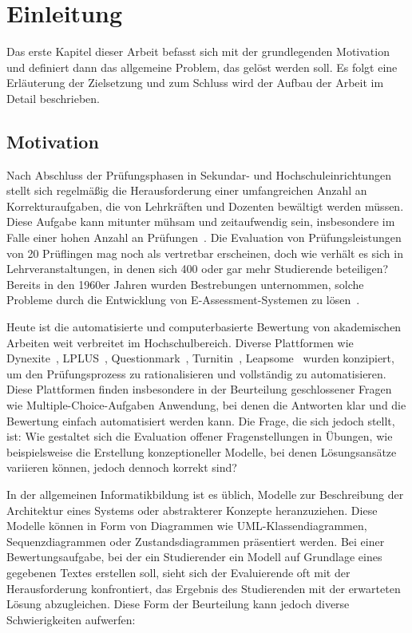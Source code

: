 \chapter{Einleitung}

Das erste Kapitel dieser Arbeit befasst sich mit der grundlegenden Motivation und definiert dann das allgemeine Problem, das gelöst werden soll. Es folgt eine Erläuterung der Zielsetzung und zum Schluss wird der Aufbau der Arbeit im Detail beschrieben.

\section{Motivation}

Nach Abschluss der Prüfungsphasen in Sekundar- und Hochschuleinrichtungen stellt sich regelmäßig die Herausforderung
einer umfangreichen Anzahl an Korrekturaufgaben, die von Lehrkräften und Dozenten bewältigt werden müssen. Diese Aufgabe
kann mitunter mühsam und zeitaufwendig sein, insbesondere im Falle einer hohen Anzahl an Prüfungen~\cite{aufwendig}.
Die Evaluation von Prüfungsleistungen von 20 Prüflingen mag noch als vertretbar erscheinen, doch wie verhält es sich in
Lehrveranstaltungen, in denen sich 400 oder gar mehr Studierende beteiligen? Bereits in den 1960er Jahren wurden
Bestrebungen unternommen, solche Probleme durch die Entwicklung von \gls{E-Assessment-Systemen} zu lösen~\cite{Hollingsworth}.

Heute ist die automatisierte und computerbasierte Bewertung von akademischen Arbeiten weit verbreitet im
Hochschulbereich. Diverse Plattformen wie Dynexite~\cite{Dynexite}, LPLUS~\cite{LPLUS}, Questionmark~\cite{Questionmark},
Turnitin~\cite{Turnitin}, Leapsome~\cite{leapsome} wurden konzipiert, um den Prüfungsprozess zu rationalisieren und vollständig zu automatisieren.
Diese Plattformen finden insbesondere in der Beurteilung geschlossener Fragen wie Multiple-Choice-Aufgaben Anwendung,
bei denen die Antworten klar und die Bewertung einfach automatisiert werden kann. Die Frage, die sich jedoch stellt,
ist: Wie gestaltet sich die Evaluation offener Fragenstellungen in Übungen, wie beispielsweise die Erstellung
konzeptioneller Modelle, bei denen Lösungsansätze variieren können, jedoch dennoch korrekt sind?

In der allgemeinen Informatikbildung ist es üblich, Modelle zur Beschreibung der Architektur eines Systems oder
abstrakterer Konzepte heranzuziehen. Diese Modelle können in Form von Diagrammen wie \ac{UML}-Klassendiagrammen,
Sequenzdiagrammen oder Zustandsdiagrammen präsentiert werden. Bei einer Bewertungsaufgabe, bei der ein Studierender ein
Modell auf Grundlage eines gegebenen Textes erstellen soll, sieht sich der Evaluierende oft mit der Herausforderung
konfrontiert, das Ergebnis des Studierenden mit der erwarteten Lösung abzugleichen. Diese Form der Beurteilung kann
jedoch diverse Schwierigkeiten aufwerfen:


